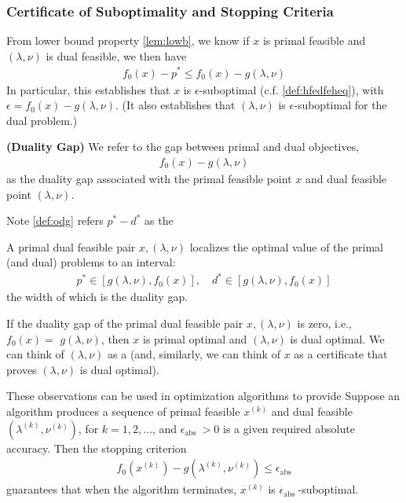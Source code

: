 \documentclass{article}
\newcommand{\bfs}[1]{\textbf{({#1}) }}
\begin{document}
\subsubsection{Certificate of Suboptimality and Stopping Criteria}
% 
From lower bound property \cref{lem:lowb}, we know if $x$ is primal feasible and $(\lambda, \nu)$ is dual feasible, we then have 
\begin{align*}
f_{0}(x)-p^*  \leq f_{0}(x)-g(\lambda, \nu)
\end{align*}
In particular, this establishes that $x$ is $\epsilon$-suboptimal (c.f. \cref{def:hfedfeheq}), with $\epsilon=f_{0}(x)-g(\lambda, \nu)$. (It also establishes that $(\lambda, \nu)$ is $\epsilon$-suboptimal for the dual problem.)
\begin{defa}\bfs{Duality Gap}
We refer to the gap between primal and dual objectives,
\begin{align*}
f_{0}(x)-g(\lambda, \nu)
\end{align*}
as the duality gap associated with the primal feasible point $x$ and dual feasible point $(\lambda, \nu)$. 
\end{defa}
\begin{rema}
Note \cref{def:odg} refers $p^* -d^* $ as the 
\end{rema}

A primal dual feasible pair $x,(\lambda, \nu)$ localizes the optimal value of the primal (and dual) problems to an interval:
\begin{align*}
p^*  \in\left[g(\lambda, \nu), f_{0}(x)\right], \quad d^*  \in\left[g(\lambda, \nu), f_{0}(x)\right]
\end{align*}
the width of which is the duality gap.

If the duality gap of the primal dual feasible pair $x,(\lambda, \nu)$ is zero, i.e., $f_{0}(x)=$ $g(\lambda, \nu)$, then $x$ is primal optimal and $(\lambda, \nu)$ is dual optimal. We can think of $(\lambda, \nu)$
as a  (and, similarly, we can think of $x$ as a certificate that proves $(\lambda, \nu)$ is dual optimal).


These observations can be used in optimization algorithms to provide  Suppose an algorithm produces a sequence of primal feasible $x^{(k)}$ and dual feasible $\left(\lambda^{(k)}, \nu^{(k)}\right)$, for $k=1,2, \ldots$, and $\epsilon_{\text {abs }}>0$ is a given required absolute accuracy. Then the stopping criterion 
\begin{align*}
f_{0}\left(x^{(k)}\right)-g\left(\lambda^{(k)}, \nu^{(k)}\right) \leq \epsilon_{\mathrm{abs}}
\end{align*}
guarantees that when the algorithm terminates, $x^{(k)}$ is $\epsilon_{\text {abs }}$-suboptimal. 
\end{document}
